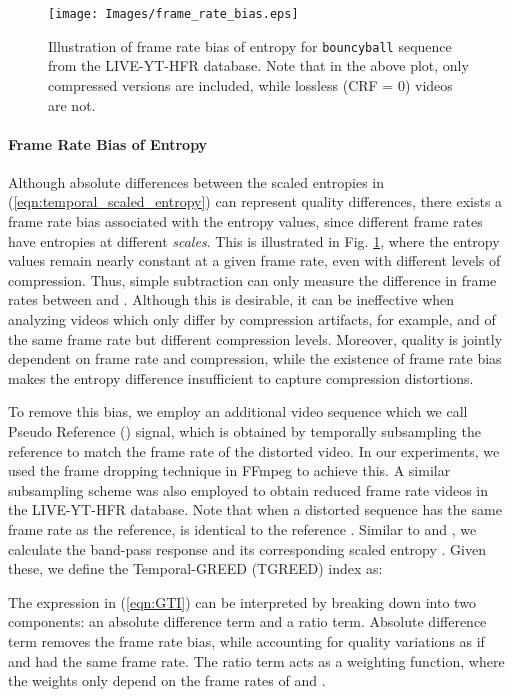 \documentclass[journal]{IEEEtran}
\begin{document}
\begin{figure}
    \centering
    \texttt{[image: Images/frame\_rate\_bias.eps]}
    \caption{Illustration of frame rate bias of entropy for \texttt{bouncyball} sequence from the LIVE-YT-HFR database. Note that in the above plot, only compressed versions are included, while lossless (CRF = 0) videos are not.}
    \label{fig:frame_rate_bias}
\end{figure}

\paragraph*{\textbf{Frame Rate Bias of Entropy}} Although absolute differences between the scaled entropies in (\ref{eqn:temporal_scaled_entropy}) can represent quality differences, there exists a frame rate bias associated with the entropy values, since different frame rates have entropies at different \textit{scales}. This is illustrated in Fig. \ref{fig:frame_rate_bias}, where the entropy values remain nearly constant at a given frame rate, even with different levels of compression. Thus, simple subtraction can only measure the difference in frame rates between  and . Although this is desirable, it can be ineffective when analyzing videos which only differ by compression artifacts, for example,  and  of the same frame rate but different compression levels. Moreover, quality is jointly dependent on frame rate and compression, while the existence of frame rate bias makes the entropy difference insufficient to capture compression distortions.

To remove this bias, we employ an additional video sequence which we call Pseudo Reference () signal, which is obtained by temporally subsampling the reference to match the frame rate of the distorted video. In our experiments, we used the frame dropping technique in FFmpeg \cite{ffmpeg} to achieve this. A similar subsampling scheme was also employed to obtain reduced frame rate videos in the LIVE-YT-HFR database. Note that when a distorted sequence has the same frame rate as the reference,  is identical to the reference . Similar to  and , we calculate the band-pass response  and its corresponding scaled entropy . Given these, we define the Temporal-GREED (TGREED) index as:


The expression in (\ref{eqn:GTI}) can be interpreted by breaking down into two components: an absolute difference term and a ratio term. Absolute difference term removes the frame rate bias, while accounting for quality variations as if  and  had the same frame rate. The ratio term acts as a weighting function, where the weights only depend on the frame rates of  and . 
\end{document}
